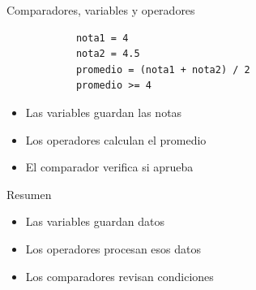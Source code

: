 \documentclass{beamer}
\begin{document}
    \begin{frame}[fragile,t]{Comparadores, variables y operadores}
        \begin{verbatim}
            nota1 = 4
            nota2 = 4.5
            promedio = (nota1 + nota2) / 2
            promedio >= 4
        \end{verbatim}
        \begin{itemize}
            \item Las variables guardan las notas
            \item Los operadores calculan el promedio
            \item El comparador verifica si aprueba
        \end{itemize}
    \end{frame}

    \begin{frame}{Resumen}
        \begin{itemize}
            \item Las variables guardan datos
            \item Los operadores procesan esos datos
            \item Los comparadores revisan condiciones
        \end{itemize}
    \end{frame}

    



\end{document}
